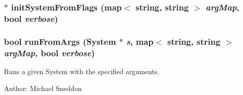 \subsubsection{$\ast$ initSystemFromFlags (map$<$ string, string $>$ {\em argMap}, bool {\em verbose})}\label{NFsim_8hh_6ea5809199618b1c969e667e5fa93d0e}


\subsubsection{\setlength{\rightskip}{0pt plus 5cm}bool runFromArgs ({\bf System} $\ast$ {\em s}, map$<$ string, string $>$ {\em argMap}, bool {\em verbose})}\label{NFsim_8hh_1df3932ce2db1db1f6c546529a162aa2}


Runs a given System with the specified arguments. 

\begin{Desc}
\item[Author:]Michael Sneddon \end{Desc}
